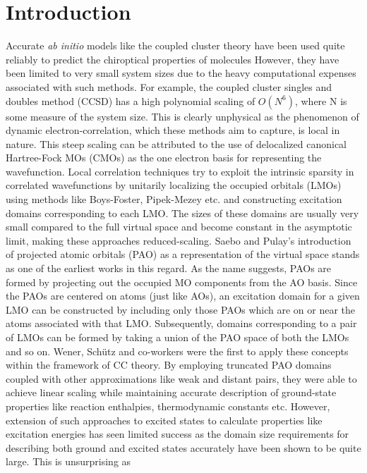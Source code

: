 \section{Introduction}
Accurate {\em ab initio} models like the coupled cluster theory have been 
used quite reliably to predict the chiroptical properties of molecules\cite{}
However, they have been limited to very small system sizes due to the heavy 
computational expenses associated with such methods. For example, the coupled cluster 
singles and doubles method (CCSD) has a high polynomial scaling of $O(N^6)$, where
N is some measure of the system size. This is clearly unphysical as the phenomenon 
of dynamic electron-correlation, which these methods aim to capture, is local in nature.\cite{}
This steep scaling can be attributed to the use of delocalized canonical 
Hartree-Fock MOs (CMOs) as the one electron basis for representing the wavefunction. 
Local correlation techniques try to exploit the intrinsic sparsity in correlated wavefunctions  
by unitarily localizing the occupied orbitals (LMOs) using methods like Boys-Foster, Pipek-Mezey etc\cite{}.
and constructing excitation domains corresponding to each LMO. The sizes of these domains
are usually very small compared to the full virtual space and become constant in the asymptotic limit,
making these approaches reduced-scaling. Saebo and Pulay's introduction of projected atomic orbitals (PAO)
as a representation of the virtual space stands as one of the earliest works in this regard\cite{}. As the name
suggests, PAOs are formed by projecting out the occupied MO components from the AO basis. Since the PAOs are
centered on atoms (just like AOs), an excitation domain for a given LMO can be constructed by 
including only those PAOs which are on or near the atoms associated with that LMO. Subsequently, domains 
corresponding to a pair of LMOs can be formed by taking a union of the PAO space of both the LMOs and so on.
Wener, Sch{\"u}tz and co-workers \cite{} were the first to apply these concepts within the framework of CC theory.
By employing truncated PAO domains coupled with other approximations like weak and distant pairs, they were 
able to achieve linear scaling while maintaining accurate description of ground-state properties
like reaction enthalpies, thermodynamic constants etc.\cite{} However, extension of such 
approaches to excited states to calculate properties like excitation energies has seen 
limited success as the domain size requirements for describing both ground and excited 
states accurately have been shown to be quite large.\cite{} This is unsurprising as 

